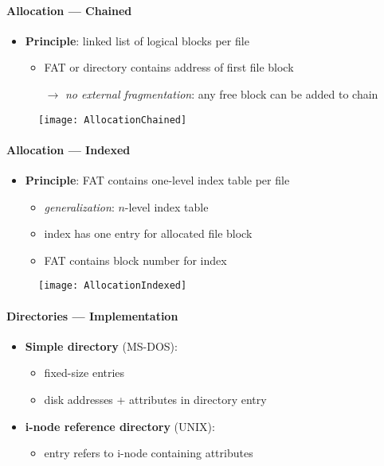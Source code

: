 \paragraph{Allocation --- Chained}
\begin{itemize}
  \item \textbf{Principle}: linked list of logical blocks per file
  \begin{itemize}
    \item FAT or directory contains address of first file block
    \item[$ \to $] \emph{no external fragmentation}: any free block can be added to chain
  \end{itemize}
\end{itemize}
\begin{figure}[h]\centering\label{AllocationChained}\texttt{[image: AllocationChained]}\end{figure}

\paragraph{Allocation --- Indexed}
\begin{itemize}
  \item \textbf{Principle}: FAT contains one-level index table per file
  \begin{itemize}
    \item \emph{generalization}: $ n $-level index table
    \item index has one entry for allocated file block
    \item FAT contains block number for index
  \end{itemize}
\end{itemize}
\begin{figure}[h]\centering\label{AllocationIndexed}\texttt{[image: AllocationIndexed]}\end{figure}

\paragraph{Directories --- Implementation}
\begin{itemize}
  \item \textbf{Simple directory} (MS-DOS):
  \begin{itemize}
    \item fixed-size entries
    \item disk addresses + attributes in directory entry
  \end{itemize}
  \item \textbf{i-node reference directory} (UNIX):
  \begin{itemize}
    \item entry refers to i-node containing attributes
  \end{itemize}
\end{itemize}


